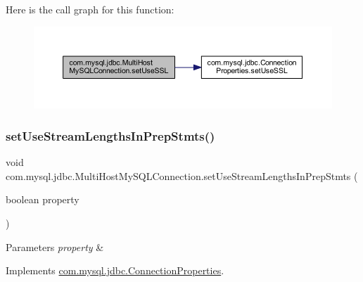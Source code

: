 Here is the call graph for this function\+:
\nopagebreak
\begin{figure}[H]
\begin{center}
\leavevmode
\includegraphics[width=350pt]{classcom_1_1mysql_1_1jdbc_1_1_multi_host_my_s_q_l_connection_ae199aca42e23e5ce684e148fb051da71_cgraph}
\end{center}
\end{figure}
\mbox{\label{classcom_1_1mysql_1_1jdbc_1_1_multi_host_my_s_q_l_connection_a29c813718362120ef1f0b6e6f0b7bb0a}} 
\subsubsection{\texorpdfstring{set\+Use\+Stream\+Lengths\+In\+Prep\+Stmts()}{setUseStreamLengthsInPrepStmts()}}
{\footnotesize\ttfamily void com.\+mysql.\+jdbc.\+Multi\+Host\+My\+S\+Q\+L\+Connection.\+set\+Use\+Stream\+Lengths\+In\+Prep\+Stmts (\begin{DoxyParamCaption}\item[{boolean}]{property }\end{DoxyParamCaption})}


\begin{DoxyParams}{Parameters}
{\em property} & \\
\hline
\end{DoxyParams}


Implements \mbox{\hyperlink{interfacecom_1_1mysql_1_1jdbc_1_1_connection_properties_a34c1ecb9d6258a0289516696cf8537be}{com.\+mysql.\+jdbc.\+Connection\+Properties}}.

